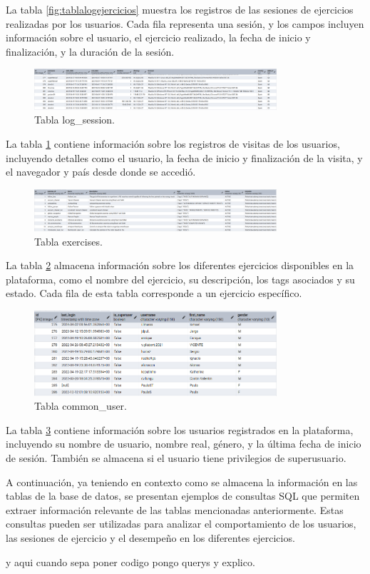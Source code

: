 \documentclass[a4paper, 12pt]{book}
\begin{document}
La tabla \ref{fig:tablalogejercicios} muestra los registros de las sesiones de ejercicios realizadas por los usuarios. Cada fila representa una sesión, y los campos incluyen información sobre el usuario, el ejercicio realizado, la fecha de inicio y finalización, y la duración de la sesión.

\begin{figure}
  \centering
  \includegraphics[width=9cm, keepaspectratio]{img/tablasesiones.png}
  \caption{Tabla log\_session.}\label{fig:tablasesiones}
\end{figure}

La tabla \ref{fig:tablasesiones} contiene información sobre los registros de visitas de los usuarios, incluyendo detalles como el usuario, la fecha de inicio y finalización de la visita, y el navegador y país desde donde se accedió.

\begin{figure}
  \centering
  \includegraphics[width=9cm, keepaspectratio]{img/tablaexercises.png}
  \caption{Tabla exercises.}\label{fig:tablaexercises}
\end{figure}

La tabla \ref{fig:tablaexercises} almacena información sobre los diferentes ejercicios disponibles en la plataforma, como el nombre del ejercicio, su descripción, los tags asociados y su estado. Cada fila de esta tabla corresponde a un ejercicio específico.

\begin{figure}
  \centering
  \includegraphics[width=9cm, keepaspectratio]{img/tablausuarios.png}
  \caption{Tabla common\_user.}\label{fig:tablausuarios}
\end{figure}

La tabla \ref{fig:tablausuarios} contiene información sobre los usuarios registrados en la plataforma, incluyendo su nombre de usuario, nombre real, género, y la última fecha de inicio de sesión. También se almacena si el usuario tiene privilegios de superusuario.

A continuación, ya teniendo en contexto como se almacena la información en las tablas de la base de datos, se presentan ejemplos de consultas SQL que permiten extraer información relevante de las tablas mencionadas anteriormente. Estas consultas pueden ser utilizadas para analizar el comportamiento de los usuarios, las sesiones de ejercicio y el desempeño en los diferentes ejercicios.

y aqui cuando sepa poner codigo pongo querys y explico.
\end{document}

